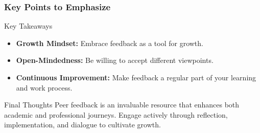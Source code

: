 \documentclass[aspectratio=169]{beamer}
\begin{document}
\begin{frame}[fragile]
    \frametitle{Key Points to Emphasize}
    \begin{block}{Key Takeaways}
        \begin{itemize}
            \item \textbf{Growth Mindset:} Embrace feedback as a tool for growth.
            \item \textbf{Open-Mindedness:} Be willing to accept different viewpoints.
            \item \textbf{Continuous Improvement:} Make feedback a regular part of your learning and work process.
        \end{itemize}
    \end{block}
    
    \begin{block}{Final Thoughts}
        Peer feedback is an invaluable resource that enhances both academic and professional journeys. Engage actively through reflection, implementation, and dialogue to cultivate growth.
    \end{block}
\end{frame}
\end{document}
